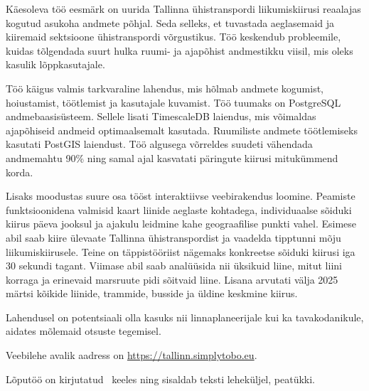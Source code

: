 
Käesoleva töö eesmärk on uurida Tallinna ühistranspordi liikumiskiirusi reaalajas kogutud asukoha andmete põhjal. Seda selleks, et tuvastada aeglasemaid ja kiiremaid sektsioone ühistranspordi võrgustikus. Töö keskendub probleemile, kuidas tõlgendada suurt hulka ruumi- ja ajapõhist andmestikku viisil, mis oleks kasulik lõppkasutajale.  

Töö käigus valmis tarkvaraline lahendus, mis hõlmab andmete kogumist, hoiustamist, töötlemist ja kasutajale kuvamist. Töö tuumaks on PostgreSQL andmebaasisüsteem. Sellele lisati TimescaleDB laiendus, mis võimaldas ajapõhiseid andmeid optimaalsemalt kasutada. Ruumiliste andmete töötlemiseks kasutati PostGIS laiendust. Töö algusega võrreldes suudeti vähendada andmemahtu 90\% ning samal ajal kasvatati päringute kiirusi mitukümmend korda.

Lisaks moodustas suure osa tööst interaktiivse veebirakendus loomine. Peamiste funktsioonidena valmisid kaart liinide aeglaste kohtadega, individuaalse sõiduki kiirus päeva jooksul ja ajakulu leidmine kahe geograafilise punkti vahel. Esimese abil saab kiire ülevaate Tallinna ühistranspordist ja vaadelda tipptunni mõju liikumiskiirusele. Teine on täppistööriist nägemaks konkreetse sõiduki kiirusi iga 30 sekundi tagant. Viimase abil saab analüüsida nii üksikuid liine, mitut liini korraga ja  erinevaid marsruute pidi sõitvaid liine. Lisana arvutati välja 2025 märtsi kõikide liinide, trammide, busside ja üldine keskmine kiirus.

Lahendusel on potentsiaali olla kasuks nii linnaplaneerijale kui ka tavakodanikule, aidates mõlemaid otsuste tegemisel.

Veebilehe avalik aadress on \url{https://tallinn.simplytobo.eu}.

Lõputöö on kirjutatud \langEst~keeles ning sisaldab teksti \calculatepages leheküljel, 
 peatükki.